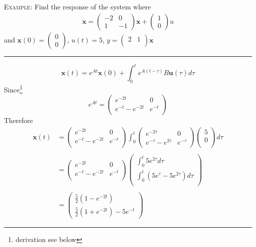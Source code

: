 \documentclass[12pt,a4paper]{article}
\begin{document}
\begin{tcolorbox}[breakable]
\textsc{Example:} Find the response of the system where 
\begin{gather*}
\mathbf{\dot{x}}=\begin{pmatrix} -
2&0\\
1&-1
\end{pmatrix}
\mathbf{x}+
\begin{pmatrix}
1\\0
\end{pmatrix}u
\end{gather*}
and $\mathbf{x}(0)=\begin{pmatrix} 0\\0 \end{pmatrix}$, $u(t)=5$, $y =\begin{pmatrix}
2&1\\
\end{pmatrix}
 \mathbf{x}$
\vspace{.2cm}\hrule
\[\mathbf{x}(t) = e^{At}\mathbf{x}(0)+\int_{0}^{t}e^{A(t-\tau)}B\mathbf{u}(\tau)d\tau\]
Since\footnote{derivation see below}
\[e^{At} = \begin{pmatrix}
e^{-2t} & 0\\
e^{-t}-e^{-2t} & e^{-t}\\
\end{pmatrix}
\]
Therefore
\begin{equation*}
\begin{aligned}
\mathbf{x}(t) &= \begin{pmatrix}
e^{-2t} & 0\\
e^{-t}-e^{-2t} & e^{-t}\\
\end{pmatrix}
\int^{t}_{0}
\begin{pmatrix}
e^{-2\tau} & 0\\
e^{-\tau}-e^{2\tau} & e^{-\tau}
\end{pmatrix}
\begin{pmatrix}
5\\
0\\
\end{pmatrix}d\tau\\\\
&=\begin{pmatrix}
e^{-2t} & 0\\
e^{-t}-e^{-2t} & e^{-t}\\
\end{pmatrix}
\begin{pmatrix}
\int_{0}^{t} 5e^{2\tau}d\tau\\
\int_{0}^{t} (5e^{\tau}-5e^{2\tau})d\tau\\
\end{pmatrix}\\\\
&=\begin{pmatrix}
\frac{5}{2}(1-e^{-2t})\\
\frac{5}{2}(1+e^{-2t})-5e^{-t}
\end{pmatrix}
\end{aligned}
\end{equation*}


\end{tcolorbox}
\end{document}
